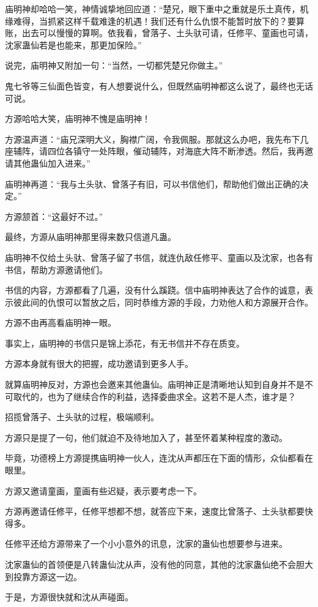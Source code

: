 \begin{this_body}
庙明神却哈哈一笑，神情诚挚地回应道：“楚兄，眼下重中之重就是乐土真传，机缘难得，当抓紧这样千载难逢的机遇！我们还有什么仇恨不能暂时放下的？要算账，出去可以慢慢的算啊。依我看，曾落子、土头驮可请，任修平、童画也可请，沈家蛊仙若是也能来，那更加保险。”

说完，庙明神又附加一句：“当然，一切都凭楚兄你做主。”

鬼七爷等三仙面色皆变，有人想要说什么，但既然庙明神都这么说了，最终也无话可说。

方源哈哈大笑，庙明神不愧是庙明神！

方源温声道：“庙兄深明大义，胸襟广阔，令我佩服。那就这么办吧，我先布下几座辅阵，请四位各镇守一处阵眼，催动辅阵，对海底大阵不断渗透。然后，我再邀请其他蛊仙加入进来。”

庙明神再道：“我与土头驮、曾落子有旧，可以书信他们，帮助他们做出正确的决定。”

方源颔首：“这最好不过。”

最终，方源从庙明神那里得来数只信道凡蛊。

庙明神不仅给土头驮、曾落子留了书信，就连仇敌任修平、童画以及沈家，也各有书信，帮助方源邀请他们。

书信的内容，方源都看了几遍，没有什么蹊跷。信中庙明神表达了合作的诚意，表示彼此间的仇恨可以暂放之后，同时恭维方源的手段，力劝他人和方源展开合作。

方源不由再高看庙明神一眼。

事实上，庙明神的书信只是锦上添花，有无书信并不存在质变。

方源本身就有很大的把握，成功邀请到更多人手。

就算庙明神反对，方源也会邀来其他蛊仙。庙明神正是清晰地认知到自身并不是不可取代的，也为了继续合作的利益，选择委曲求全。这若不是人杰，谁才是？

招揽曾落子、土头驮的过程，极端顺利。

方源只是提了一句，他们就迫不及待地加入了，甚至怀着某种程度的激动。

毕竟，功德榜上方源提携庙明神一伙人，连沈从声都压在下面的情形，众仙都看在眼里。

方源又邀请童画，童画有些迟疑，表示要考虑一下。

方源再邀请任修平，任修平想都不想，就答应下来，速度比曾落子、土头驮都要快得多。

任修平还给方源带来了一个小小意外的讯息，沈家的蛊仙也想要参与进来。

沈家蛊仙的首领便是八转蛊仙沈从声，没有他的同意，其他的沈家蛊仙绝不会胆大到投靠方源这一边。

于是，方源很快就和沈从声碰面。


\end{this_body}
